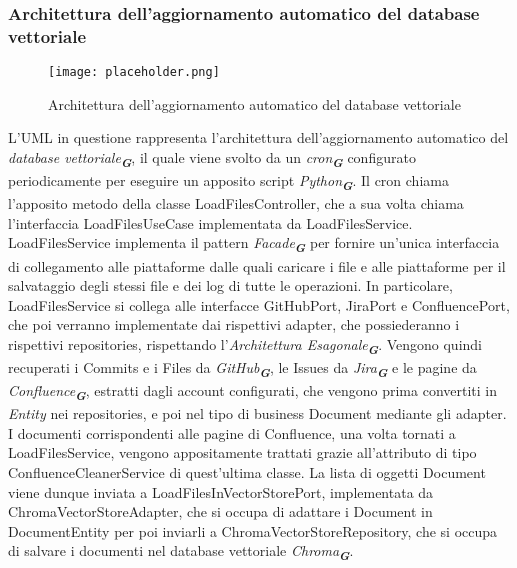 \newpage


\subsubsection{Architettura dell'aggiornamento automatico del database vettoriale}
\label{sec:architettura_aggiornamento_database_vettoriale}

\begin{figure}[h]
    \centering
    \texttt{[image: placeholder.png]}
    \caption{Architettura dell'aggiornamento automatico del database vettoriale}
\end{figure}

L'UML in questione rappresenta l'architettura dell'aggiornamento automatico del \emph{database vettoriale}\textsubscript{\textbf{\textit{G}}}, il quale viene svolto da un \emph{cron}\textsubscript{\textbf{\textit{G}}} configurato periodicamente per eseguire un apposito script \emph{Python}\textsubscript{\textbf{\textit{G}}}. Il cron chiama l'apposito metodo della classe LoadFilesController, che a sua volta chiama l'interfaccia LoadFilesUseCase implementata da LoadFilesService.\\
LoadFilesService implementa il pattern \emph{Facade}\textsubscript{\textbf{\textit{G}}} per fornire un'unica interfaccia di collegamento alle piattaforme dalle quali caricare i file e alle piattaforme per il salvataggio degli stessi file e dei log di tutte le operazioni. In particolare, LoadFilesService si collega alle interfacce GitHubPort, JiraPort e ConfluencePort, che poi verranno implementate dai rispettivi adapter, che possiederanno i rispettivi repositories, rispettando l'\emph{Architettura Esagonale}\textsubscript{\textbf{\textit{G}}}. Vengono quindi recuperati i Commits e i Files da \emph{GitHub}\textsubscript{\textbf{\textit{G}}}, le Issues da \emph{Jira}\textsubscript{\textbf{\textit{G}}} e le pagine da \emph{Confluence}\textsubscript{\textbf{\textit{G}}}, estratti dagli account configurati, che vengono prima convertiti in \emph{Entity} nei repositories, e poi nel tipo di business Document mediante gli adapter. I documenti corrispondenti alle pagine di Confluence, una volta tornati a LoadFilesService, vengono appositamente trattati grazie all'attributo di tipo ConfluenceCleanerService di quest'ultima classe. La lista di oggetti Document viene dunque inviata a LoadFilesInVectorStorePort, implementata da ChromaVectorStoreAdapter, che si occupa di adattare i Document in DocumentEntity per poi inviarli a ChromaVectorStoreRepository, che si occupa di salvare i documenti nel database vettoriale \emph{Chroma}\textsubscript{\textbf{\textit{G}}}.\\
